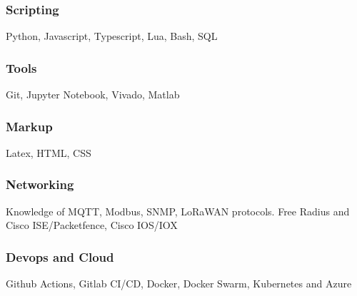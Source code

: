 \documentclass[11pt,a4paper]{article}
\begin{document}
  \subsubsection{Scripting}
  Python, Javascript, Typescript, Lua, Bash, SQL

  \subsubsection{Tools}
  Git, Jupyter Notebook, Vivado, Matlab 

  \subsubsection{Markup}
  Latex, HTML, CSS

  \subsubsection{Networking}
  Knowledge of MQTT, Modbus, SNMP, LoRaWAN protocols. Free Radius and Cisco ISE/Packetfence, Cisco IOS/IOX

  \subsubsection{Devops and Cloud}
  Github Actions, Gitlab CI/CD, Docker, Docker Swarm, Kubernetes and Azure


\end{document}
